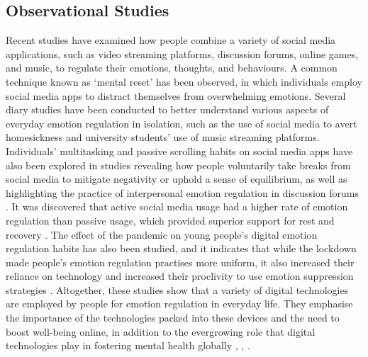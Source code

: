 \documentclass[lettersize,journal]{IEEEtran}
\begin{document}
\subsection{Observational Studies}
Recent studies have examined how people combine a variety of social media applications, such as video streaming platforms, discussion forums, online games, and music, to regulate their emotions, thoughts, and behaviours. A common technique known as `mental reset' has been observed, in which individuals employ social media apps to distract themselves from overwhelming emotions. Several diary studies have been conducted to better understand various aspects of everyday emotion regulation in isolation, such as the use of social media to avert homesickness and university students' use of music streaming platforms. Individuals' multitasking and passive scrolling habits on social media apps have also been explored in studies revealing how people voluntarily take breaks from social media to mitigate negativity or uphold a sense of equilibrium, as well as highlighting the practice of interpersonal emotion regulation in discussion forums \cite{smith2022digital}. It was discovered that active social media usage had a higher rate of emotion regulation than passive usage, which provided superior support for rest and recovery \cite{hossain2022motivational}. The effect of the pandemic on young people's digital emotion regulation habits has also been studied, and it indicates that while the lockdown made people's emotion regulation practises more uniform, it also increased their reliance on technology and increased their proclivity to use emotion suppression strategies \cite{tag2022impact}. %
Altogether, these studies show that a variety of digital technologies are employed by people for emotion regulation in everyday life. They emphasise the importance of the technologies packed into these devices and the need to boost well-being online, in addition to the evergrowing role that digital technologies play in fostering mental health globally \cite{slovak2022designing}, \cite{wadley2020digital}, \cite{smith2022digital}.

  
  
\end{document}
